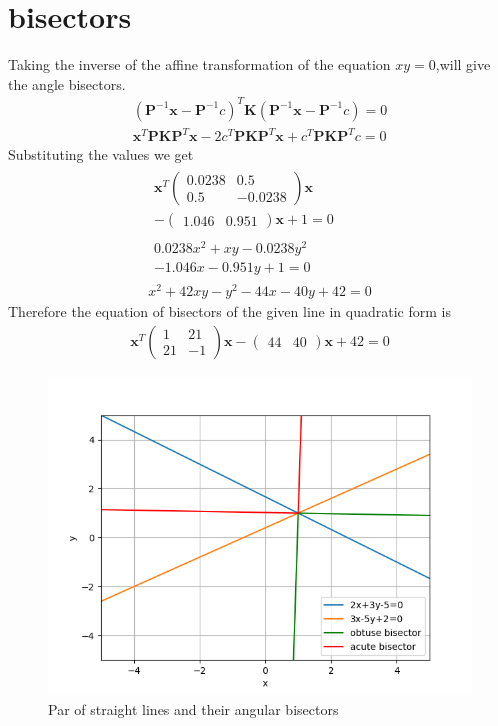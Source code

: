 \documentclass[journal,12pt,twocolumn]{IEEEtran}
\providecommand{\brak}[1]{\ensuremath{\left(#1\right)}}
\newcommand{\myvec}[1]{\ensuremath{\begin{pmatrix}#1\end{pmatrix}}}
\numberwithin{equation}{subsection}
\let\vec\mathbf
\begin{document}
\section{bisectors}
Taking the inverse of the affine transformation of the equation $xy=0$,will give the angle bisectors.
\begin{align}
    \brak{\vec{P}^{-1}\vec{x}-\vec{P}^{-1}c}^T\vec{K}\brak{\vec{P}^{-1}\vec{x}-\vec{P}^{-1}c}=0\\
    \vec{x}^T\vec{P}\vec{K}\vec{P}^T\vec{x}-2c^T\vec{P}\vec{K}\vec{P}^T\vec{x}+c^T\vec{P}\vec{K}\vec{P}^Tc=0
\end{align}
Substituting the values we get
\begin{align}
    \begin{multlined}
        \vec{x}^T\myvec{0.0238&0.5\\0.5&-0.0238}\vec{x}\\
        -\myvec{1.046&0.951}\vec{x}+1=0
    \end{multlined}\\
    \begin{multlined}
        0.0238x^2+xy-0.0238y^2\\
        -1.046x-0.951y+1=0
    \end{multlined}\\
    x^2+42xy-y^2-44x-40y+42=0
\end{align}
Therefore the equation of bisectors of the given line in quadratic form is
\begin{align}
    \vec{x}^T\myvec{1&21\\21&-1}\vec{x}-\myvec{44&40}\vec{x}+42=0
\end{align}
\begin{figure}[t]
    \centering
    \includegraphics[width=\columnwidth]{Fig2_a5.png}
    \caption{Par of straight lines and their angular bisectors}
    \label{fig:my_label}
\end{figure}
\end{document}
